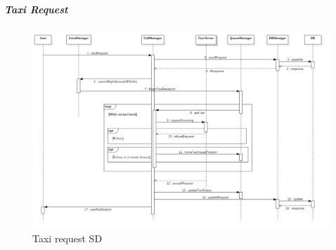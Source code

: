 \subparagraph{Taxi Request}
    \begin{figure}[H]
        \centering
        \includegraphics[width=18cm, angle =90]{./Images/SD_Request.png}
        \caption{Taxi request SD}
    \end{figure}
 
\newpage